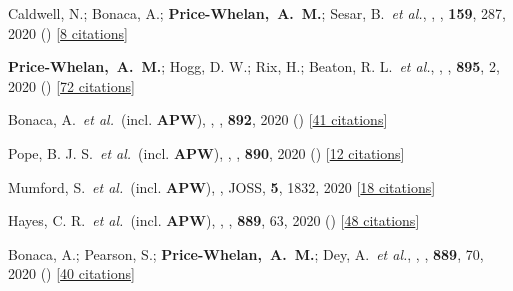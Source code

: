 \item[{\color{deemph}\scriptsize65}]Caldwell, N.; Bonaca, A.; \textbf{Price-Whelan,~A.~M.}; Sesar, B.~\textit{et al.}, , \aj, \textbf{159}, 287, 2020 () [\href{http://adsabs.harvard.edu/abs/2020AJ....159..287C}{8 citations}]

\item[{\color{deemph}\scriptsize64}]\textbf{Price-Whelan,~A.~M.}; Hogg, D. W.; Rix, H.; Beaton, R. L.~\textit{et al.}, , \apj, \textbf{895}, 2, 2020 () [\href{http://adsabs.harvard.edu/abs/2020ApJ...895....2P}{72 citations}]

\item[{\color{deemph}\scriptsize63}]Bonaca, A.~\textit{et al.}~(incl. \textbf{APW}), , \apj, \textbf{892}, 2020 () [\href{http://adsabs.harvard.edu/abs/2020ApJ...892L..37B}{41 citations}]

\item[{\color{deemph}\scriptsize62}]Pope, B. J. S.~\textit{et al.}~(incl. \textbf{APW}), , \apj, \textbf{890}, 2020 () [\href{http://adsabs.harvard.edu/abs/2020ApJ...890L..19P}{12 citations}]

\item[{\color{deemph}\scriptsize61}]Mumford, S.~\textit{et al.}~(incl. \textbf{APW}), , JOSS, \textbf{5}, 1832, 2020 [\href{http://adsabs.harvard.edu/abs/2020JOSS....5.1832M}{18 citations}]

\item[{\color{deemph}\scriptsize60}]Hayes, C. R.~\textit{et al.}~(incl. \textbf{APW}), , \apj, \textbf{889}, 63, 2020 () [\href{http://adsabs.harvard.edu/abs/2020ApJ...889...63H}{48 citations}]

\item[{\color{deemph}\scriptsize59}]Bonaca, A.; Pearson, S.; \textbf{Price-Whelan,~A.~M.}; Dey, A.~\textit{et al.}, , \apj, \textbf{889}, 70, 2020 () [\href{http://adsabs.harvard.edu/abs/2020ApJ...889...70B}{40 citations}]

